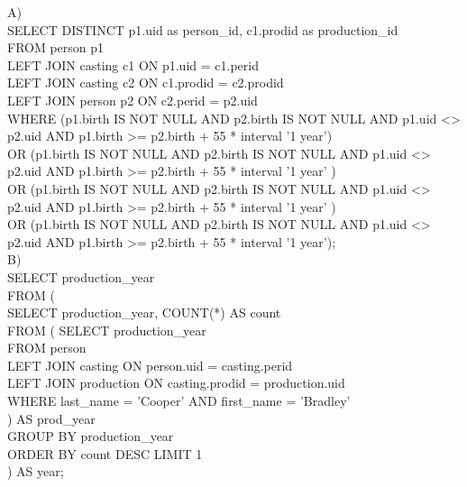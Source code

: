 \documentclass{article}
\begin{document}
A)\\
SELECT DISTINCT p1.uid as person_id, c1.prodid as production_id\\
FROM person p1\\
LEFT JOIN casting c1 ON p1.uid = c1.perid\\
LEFT JOIN casting c2 ON c1.prodid = c2.prodid\\
LEFT JOIN person p2 ON c2.perid = p2.uid\\
WHERE (p1.birth IS NOT NULL AND p2.birth IS NOT NULL AND p1.uid <> p2.uid AND p1.birth >= p2.birth + 55 * interval '1 year') \\
OR (p1.birth IS NOT NULL AND p2.birth IS NOT NULL AND p1.uid <> p2.uid AND p1.birth >= p2.birth + 55 * interval '1 year' )\\
OR (p1.birth IS NOT NULL AND p2.birth IS NOT NULL AND p1.uid <> p2.uid AND p1.birth >= p2.birth + 55 * interval '1 year' )\\
OR (p1.birth IS NOT NULL AND p2.birth IS NOT NULL AND p1.uid <> p2.uid AND p1.birth >= p2.birth + 55 * interval '1 year');\\

B)\\
SELECT production_year\\
FROM (\\
	SELECT production_year, COUNT(*) AS count\\
	FROM ( SELECT production_year\\
		FROM person\\
		LEFT JOIN casting ON person.uid = casting.perid \\
		LEFT JOIN production ON casting.prodid = production.uid\\
		WHERE last_name = 'Cooper' AND first_name = 'Bradley'\\
		) AS prod_year\\
	GROUP BY production_year\\
	ORDER BY count DESC LIMIT 1\\
	) AS year;\\
\end{document}
